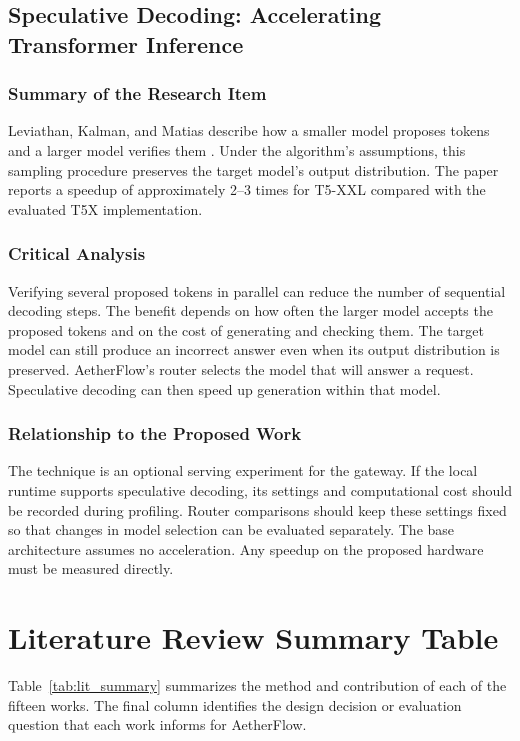 \documentclass{FastFyp}
\begin{document}
\subsection{Speculative Decoding: Accelerating Transformer Inference}
\subsubsection{Summary of the Research Item}
Leviathan, Kalman, and Matias describe how a smaller model proposes tokens and a larger model verifies them \cite{ref:SpeculativeDecoding}. Under the algorithm's assumptions, this sampling procedure preserves the target model's output distribution. The paper reports a speedup of approximately 2--3 times for T5-XXL compared with the evaluated T5X implementation.

\subsubsection{Critical Analysis}
Verifying several proposed tokens in parallel can reduce the number of sequential decoding steps. The benefit depends on how often the larger model accepts the proposed tokens and on the cost of generating and checking them. The target model can still produce an incorrect answer even when its output distribution is preserved. AetherFlow's router selects the model that will answer a request. Speculative decoding can then speed up generation within that model.

\subsubsection{Relationship to the Proposed Work}
The technique is an optional serving experiment for the gateway. If the local runtime supports speculative decoding, its settings and computational cost should be recorded during profiling. Router comparisons should keep these settings fixed so that changes in model selection can be evaluated separately. The base architecture assumes no acceleration. Any speedup on the proposed hardware must be measured directly.

\section{Literature Review Summary Table}
Table~\ref{tab:lit_summary} summarizes the method and contribution of each of the fifteen works. The final column identifies the design decision or evaluation question that each work informs for AetherFlow.
\end{document}
